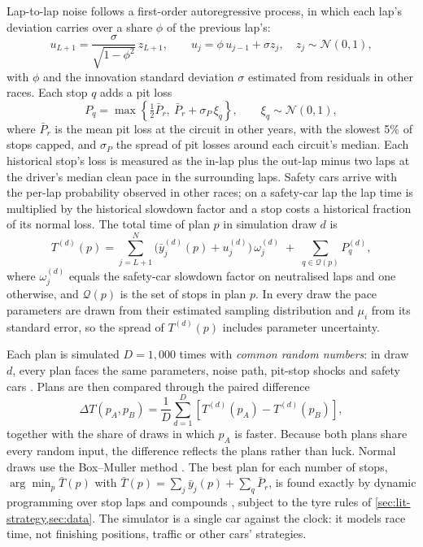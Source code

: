 \documentclass[12pt]{article}
\begin{document}
Lap-to-lap noise follows a first-order autoregressive process, in which each lap's deviation carries over a share $\phi$
of the previous lap's:
\begin{equation}\label{eq:ar1}
  u_{L+1} = \frac{\sigma}{\sqrt{1-\phi^{2}}}\,z_{L+1},\qquad u_{j} = \phi\,u_{j-1}+\sigma z_{j},\quad z_j\sim\mathcal N(0,1),
\end{equation}
with $\phi$ and the innovation standard deviation $\sigma$ estimated from residuals in other races. Each stop $q$ adds a
pit loss
\begin{equation}\label{eq:pitloss}
  P_q = \max\!\left\{\tfrac12\bar P_r,\ \bar P_r+\sigma_P\,\xi_q\right\},\qquad \xi_q\sim\mathcal N(0,1),
\end{equation}
where $\bar P_r$ is the mean pit loss at the circuit in other years, with the slowest 5\% of stops capped, and $\sigma_P$
the spread of pit losses around each circuit's median. Each historical stop's loss is measured as the in-lap plus the
out-lap minus two laps at the driver's median clean pace in the surrounding laps. Safety cars arrive with the per-lap
probability observed in other races; on a safety-car lap the lap time is multiplied by the historical slowdown factor
and a stop costs a historical fraction of its normal loss. The total time of plan $p$ in simulation draw $d$ is
\begin{equation}\label{eq:total}
  T^{(d)}(p) = \sum_{j=L+1}^{N}\Big(\bar y^{(d)}_{j}(p)+u^{(d)}_{j}\Big)\,\omega^{(d)}_{j}
  \;+\;\sum_{q\in\mathcal Q(p)} P^{(d)}_q,
\end{equation}
where $\omega^{(d)}_j$ equals the safety-car slowdown factor on neutralised laps and one otherwise, and $\mathcal Q(p)$ is
the set of stops in plan $p$. In every draw the pace parameters are drawn from their estimated sampling distribution and
$\mu_i$ from its standard error, so the spread of $T^{(d)}(p)$ includes parameter uncertainty.

Each plan is simulated $D=1{,}000$ times with \emph{common random numbers}: in draw $d$, every plan faces the same
parameters, noise path, pit-stop shocks and safety cars \parencite{law2015,glasserman2003}. Plans are then compared
through the paired difference
\begin{equation}\label{eq:crn}
  \Delta T(p_A,p_B) = \frac{1}{D}\sum_{d=1}^{D}\left[T^{(d)}(p_A)-T^{(d)}(p_B)\right],
\end{equation}
together with the share of draws in which $p_A$ is faster. Because both plans share every random input, the difference
reflects the plans rather than luck. Normal draws use the Box--Muller method \parencite{box1958}. The best plan for each
number of stops, $\arg\min_p \bar T(p)$ with $\bar T(p)=\sum_{j}\bar y_j(p)+\sum_q\bar P_r$, is found exactly by dynamic
programming over stop laps and compounds \parencite{bellman1957}, subject to the tyre rules of \cref{sec:lit-strategy,sec:data}.
The simulator is a single car against the clock: it models race time, not finishing positions, traffic or other cars'
strategies.
\end{document}
